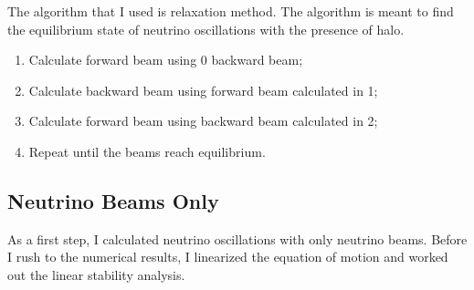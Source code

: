 The algorithm that I used is relaxation method. The algorithm is meant to find the equilibrium state of neutrino oscillations with the presence of halo.
\begin{enumerate}
\item Calculate forward beam using 0 backward beam;
\item Calculate backward beam using forward beam calculated in 1;
\item Calculate forward beam using backward beam calculated in 2;
\item Repeat until the beams reach equilibrium.
\end{enumerate}


\subsection{\label{chap:halo-sec:line-sym}Neutrino Beams Only}

As a first step, I calculated neutrino oscillations with only neutrino beams. Before I rush to the numerical results, I linearized the equation of motion and worked out the linear stability analysis.

